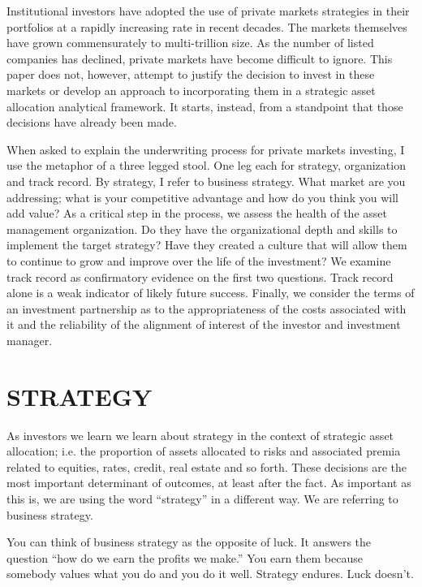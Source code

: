 \documentclass[12pt,english]{article}\usepackage[]{graphicx}\usepackage[]{color}
\begin{document}
Institutional investors have adopted the use of private markets strategies
in their portfolios at a rapidly increasing rate in recent decades.
The markets themselves have grown commensurately to multi-trillion
size. As the number of listed companies has declined, private markets
have become difficult to ignore. This paper does not, however, attempt
to justify the decision to invest in these markets or develop an approach
to incorporating them in a strategic asset allocation analytical framework.
It starts, instead, from a standpoint that those decisions have already
been made. 

When asked to explain the underwriting process for private markets
investing, I use the metaphor of a three legged stool. One leg each
for strategy, organization and track record. By strategy, I refer
to business strategy. What market are you addressing; what is your
competitive advantage and how do you think you will add value? As
a critical step in the process, we assess the health of the asset
management organization. Do they have the organizational depth and
skills to implement the target strategy? Have they created a culture
that will allow them to continue to grow and improve over the life
of the investment? We examine track record as confirmatory evidence
on the first two questions. Track record alone is a weak indicator
of likely future success. Finally, we consider the terms of an investment
partnership as to the appropriateness of the costs associated with
it and the reliability of the alignment of interest of the investor
and investment manager. 

\section*{STRATEGY}

As investors we learn we learn about strategy in the context of strategic
asset allocation; i.e. the proportion of assets allocated to risks
and associated premia related to equities, rates, credit, real estate
and so forth. These decisions are the most important determinant of
outcomes, at least after the fact. As important as this is, we are
using the word ``strategy'' in a different way. We are referring
to business strategy.

You can think of business strategy as the opposite of luck. It answers
the question ``how do we earn the profits we make.'' You earn them
because somebody values what you do and you do it well. Strategy endures.
Luck doesn't.
\end{document}
